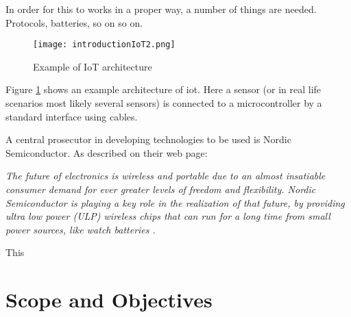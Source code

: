 \noindent In order for this to works in a proper way, a number of things are needed. Protocols, batteries, so on so on. 


\begin{figure}[ht]
    \centering
    \texttt{[image: introductionIoT2.png]}    
    \caption{Example of IoT architecture}
    \label{iotExampleArchitecture}
\end{figure}

\noindent Figure \ref{iotExampleArchitecture} shows an example architecture of \gls{iot}. Here a sensor (or in real life scenarios most likely several sensors) is connected to a \gls{microcontroller} by a standard interface using cables. 




\noindent A central prosecutor in developing technologies to be used is Nordic Semiconductor. As described on their web page: 

\begin{displayquote}
\textit{The future of electronics is wireless and portable due to an almost insatiable consumer demand for ever greater levels of freedom and flexibility. Nordic Semiconductor is playing a key role in the realization of that future, by providing ultra low power (ULP) wireless chips that can run for a long time from small power sources, like watch batteries \cite{aboutNordic}.}
\end{displayquote}

This 





\section{Scope and Objectives}

